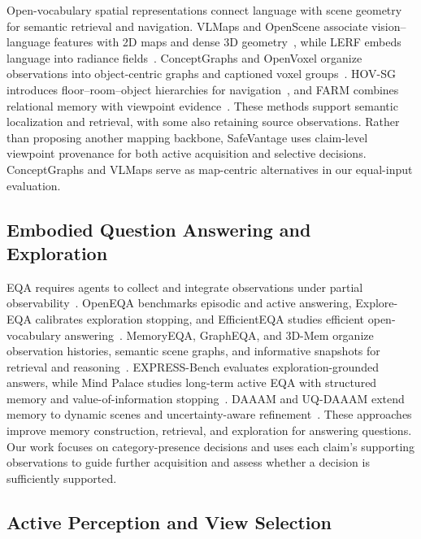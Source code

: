 \documentclass[letterpaper, 10 pt, conference]{ieeeconf}
\newcommand{\method}{SafeVantage}
\begin{document}
Open-vocabulary spatial representations connect language with scene geometry for semantic retrieval and navigation. VLMaps and OpenScene associate vision--language features with 2D maps and dense 3D geometry~\citep{huang2023vlmaps,peng2023openscene}, while LERF embeds language into radiance fields~\citep{kerr2023lerf}. ConceptGraphs and OpenVoxel organize observations into object-centric graphs and captioned voxel groups~\citep{gu2024conceptgraphs,huang2026openvoxel}. HOV-SG introduces floor--room--object hierarchies for navigation~\citep{werby2024hierarchical}, and FARM combines relational memory with viewpoint evidence~\citep{he2026farm}. These methods support semantic localization and retrieval, with some also retaining source observations. Rather than proposing another mapping backbone, \method{} uses claim-level viewpoint provenance for both active acquisition and selective decisions. ConceptGraphs and VLMaps serve as map-centric alternatives in our equal-input evaluation.

\subsection{Embodied Question Answering and Exploration}

EQA requires agents to collect and integrate observations under partial observability~\citep{das2018embodied}. OpenEQA benchmarks episodic and active answering, Explore-EQA calibrates exploration stopping, and EfficientEQA studies efficient open-vocabulary answering~\citep{majumdar2024openeqa,exploreeqa2024,cheng2025efficienteqa}. MemoryEQA, GraphEQA, and 3D-Mem organize observation histories, semantic scene graphs, and informative snapshots for retrieval and reasoning~\citep{memoryeqa2025,saxena2025grapheqa,yang2024threedmem}. EXPRESS-Bench evaluates exploration-grounded answers, while Mind Palace studies long-term active EQA with structured memory and value-of-information stopping~\citep{jiang2025express,ginting2025mindpalace}. DAAAM and UQ-DAAAM extend memory to dynamic scenes and uncertainty-aware refinement~\citep{gorlo2025daaam,zhang2026uqdaaam}. These approaches improve memory construction, retrieval, and exploration for answering questions. Our work focuses on category-presence decisions and uses each claim's supporting observations to guide further acquisition and assess whether a decision is sufficiently supported.

\subsection{Active Perception and View Selection}
\end{document}
